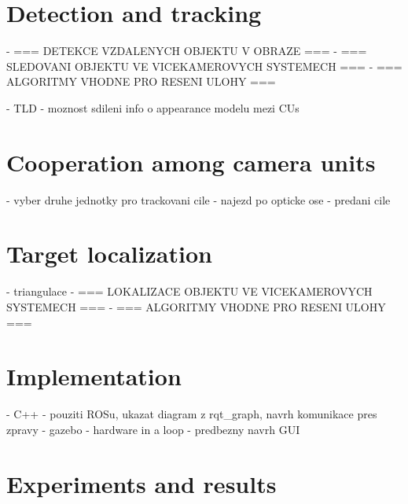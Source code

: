 \chapter{Detection and tracking}

- === DETEKCE VZDALENYCH OBJEKTU V OBRAZE ===
- === SLEDOVANI OBJEKTU VE VICEKAMEROVYCH SYSTEMECH ===
- === ALGORITMY VHODNE PRO RESENI ULOHY ===

- TLD
- moznost sdileni info o appearance modelu mezi CUs


\chapter{Cooperation among camera units}

- vyber druhe jednotky pro trackovani cile
- najezd po opticke ose
- predani cile


\chapter{Target localization}

- triangulace
- === LOKALIZACE OBJEKTU VE VICEKAMEROVYCH SYSTEMECH ===
- === ALGORITMY VHODNE PRO RESENI ULOHY ===

\chapter{Implementation}

- C++
- pouziti ROSu, ukazat diagram z rqt\_graph, navrh komunikace pres zpravy
- gazebo - hardware in a loop
- predbezny navrh GUI


\chapter{Experiments and results}

